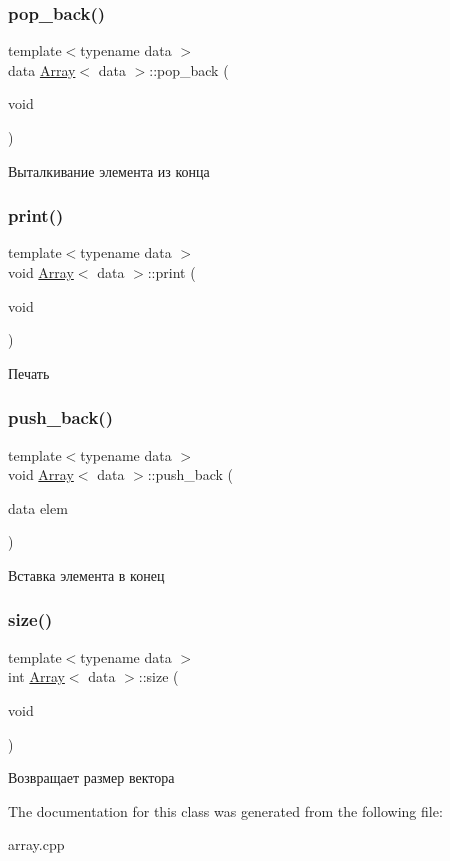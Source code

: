 \subsubsection{\texorpdfstring{pop\+\_\+back()}{pop\_back()}}
{\footnotesize\ttfamily template$<$typename data $>$ \\
data \hyperlink{classArray}{Array}$<$ data $>$\+::pop\+\_\+back (\begin{DoxyParamCaption}\item[{void}]{ }\end{DoxyParamCaption})}

Выталкивание элемента из конца \mbox{\label{classArray_a284ec9533533bdf25236033292ca0b3a}} 
\subsubsection{\texorpdfstring{print()}{print()}}
{\footnotesize\ttfamily template$<$typename data $>$ \\
void \hyperlink{classArray}{Array}$<$ data $>$\+::print (\begin{DoxyParamCaption}\item[{void}]{ }\end{DoxyParamCaption})}

Печать \mbox{\label{classArray_a79e931f2c8837cccfba2932798d60437}} 
\subsubsection{\texorpdfstring{push\+\_\+back()}{push\_back()}}
{\footnotesize\ttfamily template$<$typename data $>$ \\
void \hyperlink{classArray}{Array}$<$ data $>$\+::push\+\_\+back (\begin{DoxyParamCaption}\item[{data}]{elem }\end{DoxyParamCaption})}

Вставка элемента в конец \mbox{\label{classArray_a973c8dd45c85cef5571ed106ed1a7860}} 
\subsubsection{\texorpdfstring{size()}{size()}}
{\footnotesize\ttfamily template$<$typename data $>$ \\
int \hyperlink{classArray}{Array}$<$ data $>$\+::size (\begin{DoxyParamCaption}\item[{void}]{ }\end{DoxyParamCaption})}

Возвращает размер вектора 

The documentation for this class was generated from the following file\+:\begin{DoxyCompactItemize}
\item 
array.\+cpp\end{DoxyCompactItemize}
